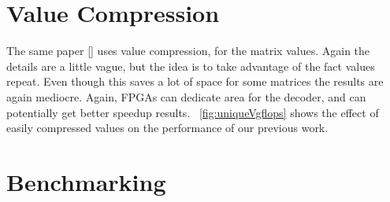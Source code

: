 \section{Value Compression}
\par The same paper [\cite{prelim:kourtis}] uses value compression, for the matrix values. Again the details are a little vague, but the idea is to take advantage of the fact values repeat. Even though this saves a lot of space for some matrices the results are again mediocre. Again, FPGAs can dedicate area for the decoder, and can potentially get better speedup results. \figurename~\ref{fig:uniqueVgflops} shows the effect of easily compressed values on the performance of our previous work.

\section{Benchmarking}
